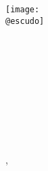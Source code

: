 
\begin{titlepage}
    \makeatletter
	\begin{center}
        \vspace{1cm}
		\texttt{[image: \\@escudo]}\vspace{1cm} 
		
		{\LARGE \textbf{\@instEdu\\[0.5ex]
				\@centroEdu\\[2cm]
				\@titulacion}}\\[0.5cm]
        {\large \textbf{\@especialidad}}\\[1.5cm] 
		{\LARGE \textbf{\@tipoDoc}}\\[1cm]	
		{\LARGE \@tituloPrimera}\\ \smallskip%
		\ifdefined\@tituloSegunda{\LARGE \@tituloSegunda}\\[3cm]
		\else \phantom{\LARGE	Texto fantasma}\\[3cm]
		\fi
		{\Large \@autor}\vfill%
	\end{center}
	
	\begin{flushright}
		{\Large {}, \@yearTF}
	\end{flushright}
    \makeatother
\end{titlepage}

